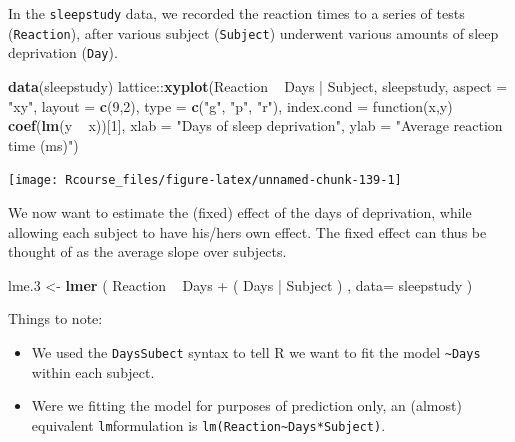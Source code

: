 \documentclass[]{book}
\newenvironment{Shaded}{\begin{snugshade}}{\end{snugshade}}
\newcommand{\KeywordTok}[1]{\textcolor[rgb]{0.13,0.29,0.53}{\textbf{{#1}}}}
\newcommand{\DataTypeTok}[1]{\textcolor[rgb]{0.13,0.29,0.53}{{#1}}}
\newcommand{\DecValTok}[1]{\textcolor[rgb]{0.00,0.00,0.81}{{#1}}}
\newcommand{\FloatTok}[1]{\textcolor[rgb]{0.00,0.00,0.81}{{#1}}}
\newcommand{\StringTok}[1]{\textcolor[rgb]{0.31,0.60,0.02}{{#1}}}
\newcommand{\NormalTok}[1]{{#1}}
\providecommand{\tightlist}{%
  \setlength{\itemsep}{0pt}\setlength{\parskip}{0pt}}
\theoremstyle{definition}
\theoremstyle{definition}
\theoremstyle{remark}
\begin{document}
In the \texttt{sleepstudy} data, we recorded the reaction times to a
series of tests (\texttt{Reaction}), after various subject
(\texttt{Subject}) underwent various amounts of sleep deprivation
(\texttt{Day}).

\begin{Shaded}
\begin{Highlighting}[]
\KeywordTok{data}\NormalTok{(sleepstudy)}
\NormalTok{lattice::}\KeywordTok{xyplot}\NormalTok{(Reaction ~}\StringTok{ }\NormalTok{Days |}\StringTok{ }\NormalTok{Subject, sleepstudy, }\DataTypeTok{aspect =} \StringTok{"xy"}\NormalTok{,}
             \DataTypeTok{layout =} \KeywordTok{c}\NormalTok{(}\DecValTok{9}\NormalTok{,}\DecValTok{2}\NormalTok{), }\DataTypeTok{type =} \KeywordTok{c}\NormalTok{(}\StringTok{"g"}\NormalTok{, }\StringTok{"p"}\NormalTok{, }\StringTok{"r"}\NormalTok{),}
             \DataTypeTok{index.cond =} \NormalTok{function(x,y) }\KeywordTok{coef}\NormalTok{(}\KeywordTok{lm}\NormalTok{(y ~}\StringTok{ }\NormalTok{x))[}\DecValTok{1}\NormalTok{],}
             \DataTypeTok{xlab =} \StringTok{"Days of sleep deprivation"}\NormalTok{,}
             \DataTypeTok{ylab =} \StringTok{"Average reaction time (ms)"}\NormalTok{)}
\end{Highlighting}
\end{Shaded}

\texttt{[image: Rcourse\_files/figure-latex/unnamed-chunk-139-1]}

We now want to estimate the (fixed) effect of the days of deprivation,
while allowing each subject to have his/hers own effect. The fixed
effect can thus be thought of as the average slope over subjects.

\begin{Shaded}
\begin{Highlighting}[]
\NormalTok{lme}\FloatTok{.3} \NormalTok{<-}\StringTok{ }\KeywordTok{lmer} \NormalTok{( Reaction ~}\StringTok{ }\NormalTok{Days +}\StringTok{ }\NormalTok{( Days |}\StringTok{ }\NormalTok{Subject ) , }\DataTypeTok{data=} \NormalTok{sleepstudy )}
\end{Highlighting}
\end{Shaded}

Things to note:

\begin{itemize}
\tightlist
\item
  We used the \texttt{Days\textbar{}Subect} syntax to tell R we want to
  fit the model \texttt{\textasciitilde{}Days} within each subject.
\item
  Were we fitting the model for purposes of prediction only, an (almost)
  equivalent \texttt{lm}formulation is
  \texttt{lm(Reaction\textasciitilde{}Days*Subject)}.
\end{itemize}
\end{document}
